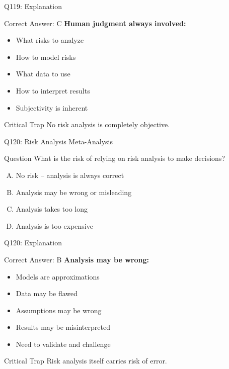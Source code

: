 \documentclass{beamer}
\begin{document}
	\begin{frame}{Q119: Explanation}
		\begin{block}{Correct Answer: C}
			\textbf{Human judgment always involved:}
			\begin{itemize}
				\item What risks to analyze
				\item How to model risks
				\item What data to use
				\item How to interpret results
				\item Subjectivity is inherent
			\end{itemize}
		\end{block}
		\begin{alertblock}{Critical Trap}
			No risk analysis is completely objective.
		\end{alertblock}
	\end{frame}
	
	\begin{frame}{Q120: Risk Analysis Meta-Analysis}
		\begin{block}{Question}
			What is the risk of relying on risk analysis to make decisions?
		\end{block}
		\begin{enumerate}[(A)]
			\item No risk -- analysis is always correct
			\item Analysis may be wrong or misleading
			\item Analysis takes too long
			\item Analysis is too expensive
		\end{enumerate}
	\end{frame}
	
	\begin{frame}{Q120: Explanation}
		\begin{block}{Correct Answer: B}
			\textbf{Analysis may be wrong:}
			\begin{itemize}
				\item Models are approximations
				\item Data may be flawed
				\item Assumptions may be wrong
				\item Results may be misinterpreted
				\item Need to validate and challenge
			\end{itemize}
		\end{block}
		\begin{alertblock}{Critical Trap}
			Risk analysis itself carries risk of error.
		\end{alertblock}
	\end{frame}
	
\end{document}
